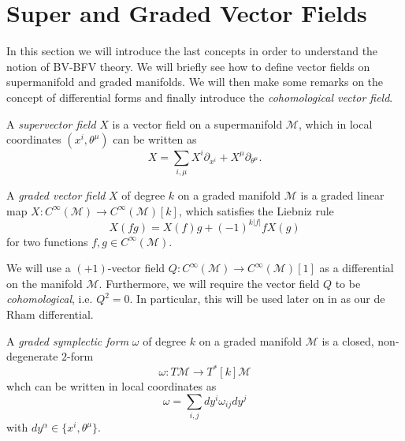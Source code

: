 \section{Super and Graded Vector Fields}
\label{sec:Sup_vector_fields}

In this section we will introduce the last concepts in order to understand the notion of BV-BFV theory.
We will briefly see how to define vector fields on supermanifold and graded manifolds.
We will then make some remarks on the concept of differential forms and finally introduce the \emph{cohomological vector field}.

\begin{definition}
    A \emph{supervector field} $X$ is a vector field on a supermanifold $\mathcal{M}$, which in local coordinates $(x^i, \theta^\mu)$ can be written as
    \begin{equation*}
        X = \sum_{i, \mu} X^i \partial_{x^i} + X^\mu \partial_{\theta^\mu} .
    \end{equation*}
\end{definition}

\begin{definition}
    A \emph{graded vector field} $X$ of degree $k$ on a graded manifold $\mathcal{M}$ is a graded linear map $X: C^\infty(\mathcal{M}) \rightarrow C^\infty(\mathcal{M})[k]$, which satisfies the Liebniz rule
    \begin{equation*}
        X(fg) = X(f)g + (-1)^{k|f|} f X(g)
    \end{equation*}
    for two functions $f,g \in C^\infty(\mathcal{M})$.
\end{definition}

We will use a $(+1)$-vector field $Q: C^\infty(\mathcal{M}) \rightarrow C^\infty(\mathcal{M})[1]$ as a differential on the manifold $\mathcal{M}$.
Furthermore, we will require the vector field $Q$ to be \emph{cohomological}, i.e. $Q^2 = 0$.
In particular, this will be used later on in  as our de Rham differential.

\begin{definition}
    A \emph{graded symplectic form} $\omega$ of degree $k$ on a graded manifold $\mathcal{M}$ is a closed, non-degenerate $2$-form
    \begin{equation*}
        \omega : T\mathcal{M} \rightarrow T^*[k]\mathcal{M}
    \end{equation*}
    whch can be written in local coordinates as
    \begin{equation*}
        \omega = \sum_{i,j} dy^i \omega_{ij} dy^j
    \end{equation*}
    with $dy^\alpha \in \{x^i, \theta^\mu\}$.
\end{definition}